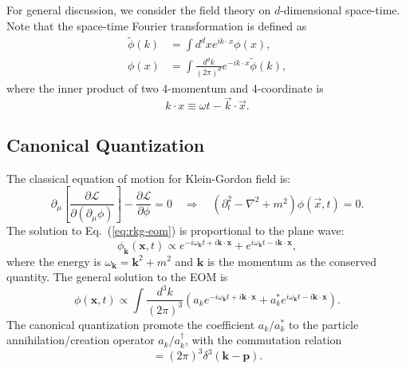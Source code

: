 For general discussion, we consider the field theory on $d$-dimensional space-time.
Note that the space-time Fourier transformation is defined as
\begin{equation}
\begin{aligned}
	\tilde{\phi}(k) &= \int d^{d}x e^{ik\cdot x} \phi(x), \\ 
	\phi(x) &= \int \frac{d^{d}k}{(2\pi)^{d}} e^{-ik\cdot x}\tilde{\phi}(k),
\end{aligned}
\end{equation}
where the inner product of two 4-momentum and 4-coordinate is
\begin{equation}
	k\cdot x \equiv \omega t-\vec k\cdot \vec x.
\end{equation}


\subsection{Canonical Quantization}
The classical equation of motion for Klein-Gordon field is:
\begin{equation}\label{eq:rkg-eom}
	\partial_\mu \left[\frac{\partial \mathcal L}{\partial(\partial_\mu \phi)}\right] - \frac{\partial \mathcal L}{\partial \phi} = 0 
	\quad \Longrightarrow \quad 
	(\partial_t^2-\nabla^2+m^2)\phi(\vec x,t) = 0.
\end{equation}
The solution to Eq.~(\ref{eq:rkg-eom}) is proportional to the plane wave:
\begin{equation*}
	\phi_{\bm k}(\bm x, t) \propto e^{-i\omega_{\bm{k}}t+i\bm{k}\cdot\bm{x}} + e^{i\omega_{\bm{k}}t-i\bm{k}\cdot\bm{x}},
\end{equation*}
where the energy is $\omega_{\bm{k}}=\bm{k}^2+m^2$ and $\bm k$ is the momentum as the conserved quantity.
The general solution to the EOM is
\begin{equation}
	\phi(\bm x,t) \propto \int \frac{d^{3} k}{(2\pi)^{3}} \left(
		a_{k}e^{-i\omega_{\bm{k}}t+i\bm{k}\cdot\bm{x}} + 
		a^*_{k}e^{i\omega_{\bm{k}}t-i\bm{k}\cdot\bm{x}} 
	\right).
\end{equation}
The canonical quantization promote the coefficient $a_{k}/a_{k}^*$ to the particle annihilation/creation operator $a_{k}/a_{k}^\dagger$, with the commutation relation
\begin{equation}
	[a_{k}, a_{p}^\dagger] = (2\pi)^{3} \delta^{3}(\bm{k}-\bm{p}).
\end{equation}



